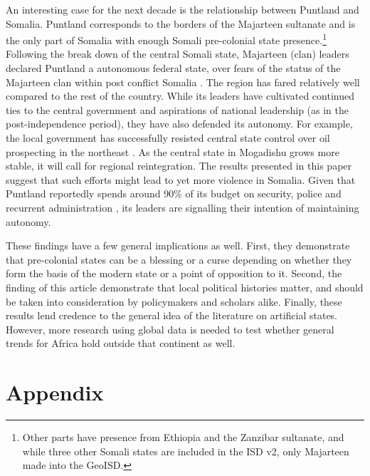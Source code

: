 An interesting case for the next decade is the relationship between Puntland and
Somalia. Puntland corresponds to the borders of the Majarteen sultanate and is
the only part of Somalia with enough Somali pre-colonial state
presence.\footnote{Other parts have presence from Ethiopia and the Zanzibar
sultanate, and while three other Somali states are included in the ISD v2, only
Majarteen made into the GeoISD.} Following the break down of the central
Somali state, Majarteen (clan) leaders declared Puntland a autonomous federal
state, over fears of the status of the Majarteen clan within post conflict
Somalia \citep{Johnson_2014}. The region has fared relatively well compared to the
rest of the country. While its leaders have cultivated continued ties to the
central government and aspirations of national leadership (as in the
post-independence period), they have also defended its autonomy. For example,
the local government has successfully resisted central state control over oil
prospecting in the northeast \citep{Johnson_2014}. As the central state in
Mogadishu grows more stable, it will call for regional reintegration. The
results presented in this paper suggest that such efforts might lead to yet more
violence in Somalia. Given that Puntland reportedly spends around 90\% of its
budget on security, police and recurrent administration \citep{Johnson_2014},
its leaders are signalling their intention of maintaining autonomy.

These findings have a few general implications as well. First, they demonstrate
that pre-colonial states can be a blessing or a curse depending on whether they
form the basis of the modern state or a point of opposition to it. Second, the
finding of this article demonstrate that local political histories matter, and
should be taken into consideration by policymakers and scholars alike. Finally,
these results lend credence to the general idea of the literature on artificial
states. However, more research using global data is needed to test whether
general trends for Africa hold outside that continent as well.

\clearpage




\clearpage

\section{Appendix}

